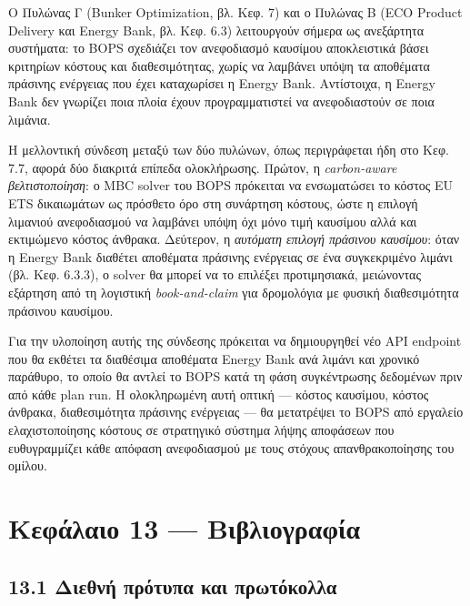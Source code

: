 Ο Πυλώνας Γ (Bunker Optimization, βλ. Κεφ. 7) και ο Πυλώνας Β (ECO
Product Delivery και Energy Bank, βλ. Κεφ. 6.3) λειτουργούν σήμερα ως
ανεξάρτητα συστήματα: το BOPS σχεδιάζει τον ανεφοδιασμό καυσίμου
αποκλειστικά βάσει κριτηρίων κόστους και διαθεσιμότητας, χωρίς να
λαμβάνει υπόψη τα αποθέματα πράσινης ενέργειας που έχει καταχωρίσει η
Energy Bank. Αντίστοιχα, η Energy Bank δεν γνωρίζει ποια πλοία έχουν
προγραμματιστεί να ανεφοδιαστούν σε ποια λιμάνια.

Η μελλοντική σύνδεση μεταξύ των δύο πυλώνων, όπως περιγράφεται ήδη στο
Κεφ. 7.7, αφορά δύο διακριτά επίπεδα ολοκλήρωσης. Πρώτον, η
\emph{carbon-aware βελτιστοποίηση}: ο MBC solver του BOPS πρόκειται να
ενσωματώσει το κόστος EU ETS δικαιωμάτων ως πρόσθετο όρο στη συνάρτηση
κόστους, ώστε η επιλογή λιμανιού ανεφοδιασμού να λαμβάνει υπόψη όχι μόνο
τιμή καυσίμου αλλά και εκτιμώμενο κόστος άνθρακα. Δεύτερον, η
\emph{αυτόματη επιλογή πράσινου καυσίμου}: όταν η Energy Bank διαθέτει
αποθέματα πράσινης ενέργειας σε ένα συγκεκριμένο λιμάνι (βλ. Κεφ.
6.3.3), ο solver θα μπορεί να το επιλέξει προτιμησιακά, μειώνοντας
εξάρτηση από τη λογιστική \emph{book-and-claim} για δρομολόγια με φυσική
διαθεσιμότητα πράσινου καυσίμου.

Για την υλοποίηση αυτής της σύνδεσης πρόκειται να δημιουργηθεί νέο API
endpoint που θα εκθέτει τα διαθέσιμα αποθέματα Energy Bank ανά λιμάνι
και χρονικό παράθυρο, το οποίο θα αντλεί το BOPS κατά τη φάση
συγκέντρωσης δεδομένων πριν από κάθε plan run. Η ολοκληρωμένη αυτή
οπτική --- κόστος καυσίμου, κόστος άνθρακα, διαθεσιμότητα πράσινης
ενέργειας --- θα μετατρέψει το BOPS από εργαλείο ελαχιστοποίησης κόστους
σε στρατηγικό σύστημα λήψης αποφάσεων που ευθυγραμμίζει κάθε απόφαση
ανεφοδιασμού με τους στόχους απανθρακοποίησης του ομίλου.

\pagebreak

\chapter{Κεφάλαιο 13 ---
Βιβλιογραφία}\label{ux3baux3b5ux3c6ux3acux3bbux3b1ux3b9ux3bf-13-ux3b2ux3b9ux3b2ux3bbux3b9ux3bfux3b3ux3c1ux3b1ux3c6ux3afux3b1}

\section{13.1 Διεθνή πρότυπα και
πρωτόκολλα}\label{ux3b4ux3b9ux3b5ux3b8ux3bdux3ae-ux3c0ux3c1ux3ccux3c4ux3c5ux3c0ux3b1-ux3baux3b1ux3b9-ux3c0ux3c1ux3c9ux3c4ux3ccux3baux3bfux3bbux3bbux3b1}

